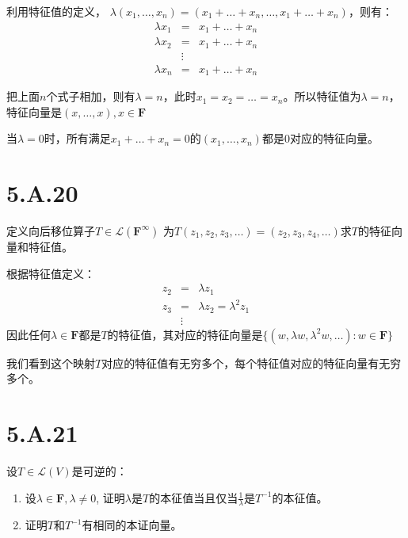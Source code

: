 \documentclass[10pt,a4paper,UTF8]{article}
\begin{document}
\begin{answer}
利用特征值的定义， \(\lambda(x_{1},\ldots ,x_{n}) = (x_{1}+\ldots + x_{n},\ldots ,x_{1}+\ldots +x_{n})\)，则有：
\begin{eqnarray}
\label{eq:13}
\lambda x_{1}&=&x_{1}+ \ldots + x_{n} \\
\lambda x_{2}&=&x_{1}+ \ldots + x_{n} \\
&\vdots& \\
\lambda x_{n}&=&x_{1}+ \ldots + x_{n}
\end{eqnarray}

把上面\(n\)个式子相加，则有\(\lambda = n\)，此时\(x_{1} =x_{2}= \ldots =x_{n}\)。所以特征值为\(\lambda = n\)，特征向量是\((x,\ldots ,x),x\in \mathbf{F}\)

当\(\lambda = 0\)时，所有满足\(x_{1} + \ldots + x_{n}=0\)的\((x_{1},\ldots ,x_{n})\)都是\(0\)对应的特征向量。
\end{answer}

\section{5.A.20}
\label{sec:org3e09c48}


\begin{problem}
定义向后移位算子\(T\in \mathcal{L}(\mathbf{F}^{\infty})\) 为\(T(z_{1},z_{2},z_{3},\ldots ) = (z_{2},z_{3},z_{4},\ldots )\)求\(T\)的特征向量和特征值。
\end{problem}

\begin{answer}
根据特征值定义：
\begin{eqnarray}
\label{eq:14}
z_{2} &=& \lambda z_{1} \\
z_{3} &=& \lambda z_{2} = \lambda^{2} z_{1} \\
&\vdots&
\end{eqnarray}
因此任何\(\lambda \in \mathbf{F}\)都是\(T\)的特征值，其对应的特征向量是\(\{(w,\lambda w, \lambda^{2} w,\ldots ): w\in \mathbf{F}\}\)

我们看到这个映射\(T\)对应的特征值有无穷多个，每个特征值对应的特征向量有无穷多个。
\end{answer}
\section{5.A.21}
\label{sec:org2765d77}


\begin{problem}
设\(T\in \mathcal{L}(V)\)是可逆的：
\begin{enumerate}
\item 设\(\lambda \in \mathbf{F},\lambda \neq 0\), 证明\(\lambda\)是\(T\)的本征值当且仅当\(\frac{1}{\lambda}\)是\(T^{-1}\)的本征值。
\item 证明\(T\)和\(T^{-1}\)有相同的本证向量。
\end{enumerate}
\end{problem}
\end{document}
